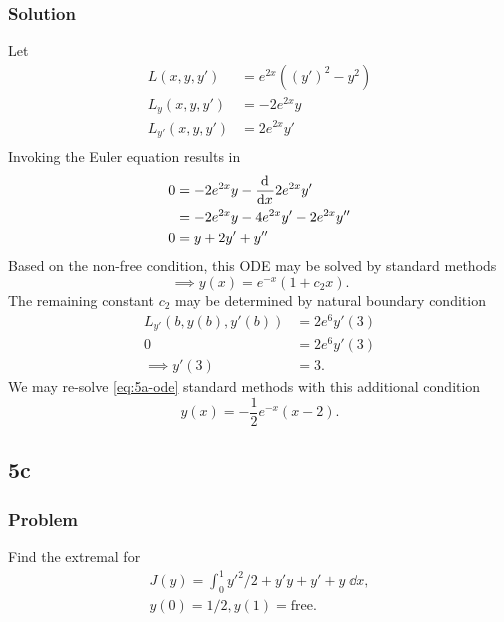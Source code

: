 \documentclass[12pt,twoside]{article}
\begin{document}
\subsubsection*{Solution}
Let
\begin{align*}
  L(x,y,y') &= e^{2 x} \left({\left(y'\right)}^2-y^2\right) \\
  L_y(x,y,y') &= -2 e^{2 x} y \\
  L_{y'}(x,y,y') &= 2 e^{2 x} y' \\
\end{align*}
Invoking the Euler equation results in
\begin{equation}
\label{eq:5a-ode}
\begin{aligned}
  0 &= -2 e^{2 x} y - \frac{\mathrm{d}^{} {}}{\mathrm{d}{x}^{}}2 e^{2 x} y' \\
    &= -2 e^{2 x} y - 4e^{2x}y' - 2e^{2x}y'' \\
  0 &= y + 2y' + y''
\end{aligned}
\end{equation}
Based on the non-free condition, this ODE may be solved by standard methods
\begin{equation*}
  \implies y(x) = e^{-x}(1+c_2x).
\end{equation*}
The remaining constant $c_2$ may be determined by natural boundary condition
\begin{align*}
  L_{y'}(b,y(b),y'(b)) &= 2 e^{6} y'(3) \\
  0 &= 2e^{6}y'(3) \\
  \implies y'(3) &= 3.
\end{align*}
We may re-solve \cref{eq:5a-ode} standard methods with this additional condition
\begin{equation*}
  \boxed{y(x) = -\frac{1}{2} e^{-x} (x-2).}
\end{equation*}

\subsection{5c}
\subsubsection*{Problem}
Find the extremal for
\begin{equation}
  \label{eq:5b-problem}
  \begin{aligned}
    J(y) = \int_0^1 y'^2/2+y'y+y'+y\;\dd{x}, \\
    y(0)=1/2, y(1)=\text{free}. \\
  \end{aligned}
\end{equation}
\end{document}
